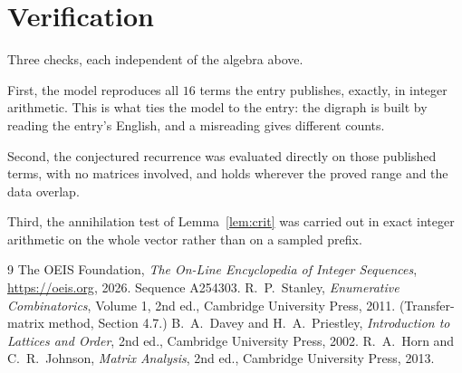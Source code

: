\documentclass[11pt,a4paper]{article}
\theoremstyle{plain}
\theoremstyle{definition}
\begin{document}
\section{Verification}

Three checks, each independent of the algebra above.

First, the model reproduces all $16$ terms the entry publishes, exactly, in integer
arithmetic. This is what ties the model to the entry: the digraph is built by reading the
entry's English, and a misreading gives different counts.

Second, the conjectured recurrence was evaluated directly on those published terms, with no
matrices involved, and holds wherever the proved range and the data overlap.

Third, the annihilation test of Lemma~\ref{lem:crit} was carried out in exact integer
arithmetic on the whole vector rather than on a sampled prefix.

\begin{thebibliography}{9}
 The OEIS Foundation, \emph{The On-Line Encyclopedia of Integer
Sequences}, \url{https://oeis.org}, 2026. Sequence A254303.
 R.~P.~Stanley, \emph{Enumerative Combinatorics}, Volume 1, 2nd ed.,
Cambridge University Press, 2011. (Transfer-matrix method, Section 4.7.)
 B.~A.~Davey and H.~A.~Priestley, \emph{Introduction to Lattices and
Order}, 2nd ed., Cambridge University Press, 2002.
 R.~A.~Horn and C.~R.~Johnson, \emph{Matrix Analysis}, 2nd ed., Cambridge
University Press, 2013.
\end{thebibliography}
\end{document}
